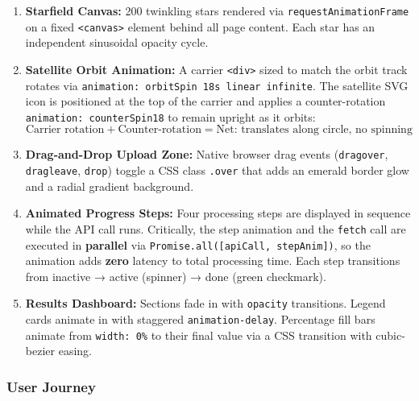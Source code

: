 \documentclass[12pt, a4paper]{article}
\begin{document}
\begin{enumerate}[leftmargin=*, label=\textbf{\arabic*.}]
  \item \textbf{Starfield Canvas:} 200 twinkling stars rendered via \texttt{requestAnimationFrame} on a fixed \texttt{<canvas>} element behind all page content. Each star has an independent sinusoidal opacity cycle.

  \item \textbf{Satellite Orbit Animation:} A carrier \texttt{<div>} sized to match the orbit track rotates via \texttt{animation: orbitSpin 18s linear infinite}. The satellite SVG icon is positioned at the top of the carrier and applies a counter-rotation \texttt{animation: counterSpin18} to remain upright as it orbits:
  \[
    \text{Carrier rotation} + \text{Counter-rotation} = \text{Net: translates along circle, no spinning}
  \]

  \item \textbf{Drag-and-Drop Upload Zone:} Native browser drag events (\texttt{dragover}, \texttt{dragleave}, \texttt{drop}) toggle a CSS class \texttt{.over} that adds an emerald border glow and a radial gradient background.

  \item \textbf{Animated Progress Steps:} Four processing steps are displayed in sequence while the API call runs. Critically, the step animation and the \texttt{fetch} call are executed in \textbf{parallel} via \texttt{Promise.all([apiCall, stepAnim])}, so the animation adds \textbf{zero} latency to total processing time. Each step transitions from inactive → active (spinner) → done (green checkmark).

  \item \textbf{Results Dashboard:} Sections fade in with \texttt{opacity} transitions. Legend cards animate in with staggered \texttt{animation-delay}. Percentage fill bars animate from \texttt{width: 0\%} to their final value via a CSS transition with cubic-bezier easing.
\end{enumerate}

\subsubsection{User Journey}
\end{document}
